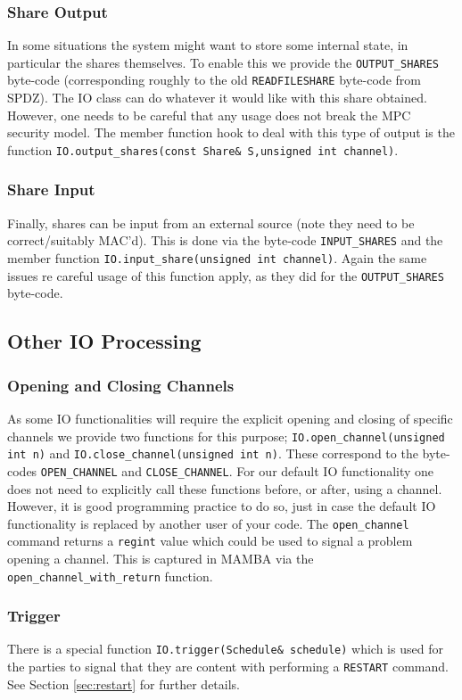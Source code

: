 \subsubsection{Share Output}
In some situations the system might want to store some
internal state, in particular the shares themselves.
To enable this we provide the \verb+OUTPUT_SHARES+
byte-code (corresponding roughly to the old
\verb+READFILESHARE+ byte-code from SPDZ). The IO class can do
whatever it would like with this share obtained. However,
one needs to be careful that any usage does not break the
MPC security model.
The member function hook to deal with this type of
output is the function
\verb+IO.output_shares(const Share& S,unsigned int channel)+.

\subsubsection{Share Input}
Finally, shares can be input from an external source
(note they need to be correct/suitably MAC'd). This
is done via the byte-code \verb+INPUT_SHARES+ and the
member function \verb+IO.input_share(unsigned int channel)+.
Again the same issues re careful usage of this function
apply, as they did for the \verb+OUTPUT_SHARES+ byte-code.


\subsection{Other IO Processing}

\subsubsection{Opening and Closing Channels}
As some IO functionalities will require the explicit opening
and closing of specific channels we provide two functions
for this purpose;
\verb+IO.open_channel(unsigned int n)+
and
\verb+IO.close_channel(unsigned int n)+.
These correspond to the byte-codes \verb+OPEN_CHANNEL+ and
\verb+CLOSE_CHANNEL+.
For our default IO functionality one does not need to
explicitly call these functions before, or after,
using a channel.
However, it is good programming practice to do so, just
in case the default IO functionality is replaced by another
user of your code.
The \verb+open_channel+ command returns a \verb+regint+
value which could be used to signal a problem opening a channel.
This is captured in MAMBA via the \verb+open_channel_with_return+
function.

\subsubsection{Trigger}
There is a special function \verb+IO.trigger(Schedule& schedule)+
which is used for the parties to signal that they are content with
performing a \verb+RESTART+ command.
See Section \ref{sec:restart} for further details.

